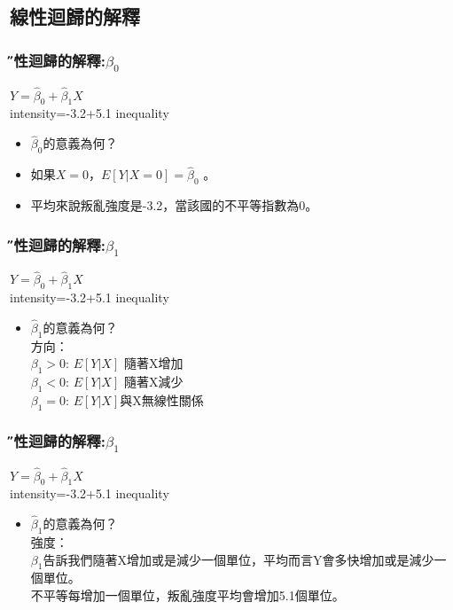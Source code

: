 \documentclass[xcolor=dvipsnames]{beamer}
\begin{document}
\subsection{線性迴歸的解釋}
\begin{frame}\frametitle{\H 線性迴歸的解釋:$\beta_{0}$}
\begin{center}
$Y=\hat{\beta}_{0}+\hat{\beta}_{1} X $\\
intensity=-3.2+5.1 inequality
\end{center}
\begin{itemize}
\item $\hat{\beta}_{0}$的意義為何？
\item 如果$X=0$，$E[Y|X=0]=  \hat{\beta}_{0}$ 。
\item 平均來說叛亂強度是-3.2，當該國的不平等指數為0。
\end{itemize}
\end{frame}
\begin{frame}\frametitle{\H 線性迴歸的解釋:$\beta_{1}$}
\begin{center}
$Y=\hat{\beta}_{0}+\hat{\beta}_{1}X   $\\
intensity=-3.2+5.1 inequality
\end{center}
\begin{itemize}
\item $\hat{\beta}_{1}$的意義為何？\\
方向：\\
$\beta_{1}>0$: $E[Y|X]$ 隨著X增加\\
$\beta_{1}<0$: $E[Y|X]$ 隨著X減少\\
$\beta_{1}=0$: $E[Y|X]$與X無線性關係
\end{itemize}
\end{frame}
\begin{frame}\frametitle{\H 線性迴歸的解釋:$\beta_{1}$}
\begin{center}
$Y=\hat{\beta}_{0}+\hat{\beta}_{1}X   $\\
intensity=-3.2+5.1 inequality
\end{center}
\begin{itemize}
\item $\hat{\beta}_{1}$的意義為何？\\
強度：\\
$\beta_{1}$告訴我們隨著X增加或是減少一個單位，平均而言Y會多快增加或是減少一個單位。\\
不平等每增加一個單位，叛亂強度平均會增加5.1個單位。
\end{itemize}
\end{frame}
\end{document}
